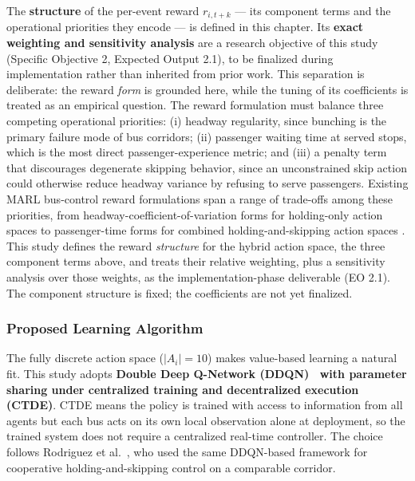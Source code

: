 The \textbf{structure} of the per-event reward $r_{i, t+k}$ --- its component terms and the operational priorities they encode --- is defined in this chapter. Its \textbf{exact weighting and sensitivity analysis} are a research objective of this study (Specific Objective 2, Expected Output 2.1), to be finalized during implementation rather than inherited from prior work. This separation is deliberate: the reward \textit{form} is grounded here, while the tuning of its coefficients is treated as an empirical question. The reward formulation must balance three competing operational priorities: (i) headway regularity, since bunching is the primary failure mode of bus corridors; (ii) passenger waiting time at served stops, which is the most direct passenger-experience metric; and (iii) a penalty term that discourages degenerate skipping behavior, since an unconstrained skip action could otherwise reduce headway variance by refusing to serve passengers. Existing MARL bus-control reward formulations span a range of trade-offs among these priorities, from headway-coefficient-of-variation forms for holding-only action spaces \cite{Wangsun,Wang2023MultiObj} to passenger-time forms for combined holding-and-skipping action spaces \cite{Rodriguez2023Cooperative}. This study defines the reward \textit{structure} for the hybrid action space, the three component terms above, and treats their relative weighting, plus a sensitivity analysis over those weights, as the implementation-phase deliverable (EO 2.1). The component structure is fixed; the coefficients are not yet finalized.

\subsubsection{Proposed Learning Algorithm}
\label{subsec:proposed-algorithm}

The fully discrete action space ($|A_i| = 10$) makes value-based learning a natural fit. This study adopts \textbf{Double Deep Q-Network (DDQN)~\cite{vanHasselt2016DDQN} with parameter sharing under centralized training and decentralized execution (CTDE)}. CTDE means the policy is trained with access to information from all agents but each bus acts on its own local observation alone at deployment, so the trained system does not require a centralized real-time controller. The choice follows Rodriguez et al.~\cite{Rodriguez2023Cooperative}, who used the same DDQN-based framework for cooperative holding-and-skipping control on a comparable corridor.

